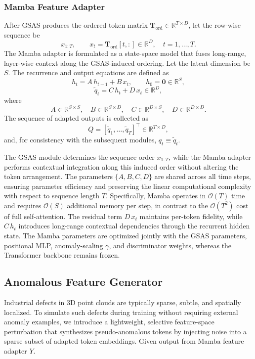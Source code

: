 \subsubsection{Mamba Feature Adapter}

After GSAS produces the ordered token matrix $\mathbf{T}_{\mathrm{ord}}\in\mathbb{R}^{T\times D}$, let the row-wise sequence be
$$
x_{1:T},\qquad x_t=\mathbf{T}_{\mathrm{ord}}[t,:]\in\mathbb{R}^D,\quad t=1,\dots,T.
$$
The Mamba adapter is formulated as a state-space model that fuses long-range, layer-wise context along the GSAS-induced ordering. Let the latent dimension be $S$. The recurrence and output equations are defined as
\begin{equation}
h_t = A\,h_{t-1} + B\,x_t,\qquad h_0=\mathbf{0}\in\mathbb{R}^S,
\end{equation}
\begin{equation}
\tilde{q}_t = C\,h_t + D\,x_t \in\mathbb{R}^D,
\end{equation}
where
$$
A\in\mathbb{R}^{S\times S},\quad 
B\in\mathbb{R}^{S\times D},\quad 
C\in\mathbb{R}^{D\times S},\quad 
D\in\mathbb{R}^{D\times D}.
$$
The sequence of adapted outputs is collected as
$$
Q=[\tilde{q}_1,\dots,\tilde{q}_T]^\top\in\mathbb{R}^{T\times D},
$$
and, for consistency with the subsequent modules, $q_t\equiv\tilde{q}_t$.

The GSAS module determines the sequence order $x_{1:T}$, while the Mamba adapter performs contextual integration along this induced order without altering the token arrangement. The parameters $\{A,B,C,D\}$ are shared across all time steps, ensuring parameter efficiency and preserving the linear computational complexity with respect to sequence length $T$. Specifically, Mamba operates in $\mathcal{O}(T)$ time and requires $\mathcal{O}(S)$ additional memory per step, in contrast to the $\mathcal{O}(T^2)$ cost of full self-attention. The residual term $D\,x_t$ maintains per-token fidelity, while $C\,h_t$ introduces long-range contextual dependencies through the recurrent hidden state. The Mamba parameters are optimized jointly with the GSAS parameters, positional MLP, anomaly-scaling $\gamma$, and discriminator weights, whereas the Transformer backbone remains frozen.

\subsection{Anomalous Feature Generator}
Industrial defects in 3D point clouds are typically sparse, subtle, and spatially localized. To simulate such defects during training without requiring external anomaly examples, we introduce a lightweight, selective feature-space perturbation that synthesizes pseudo-anomalous tokens by injecting noise into a sparse subset of adapted token embeddings. Given output from Mamba feature adapter $Y$.

